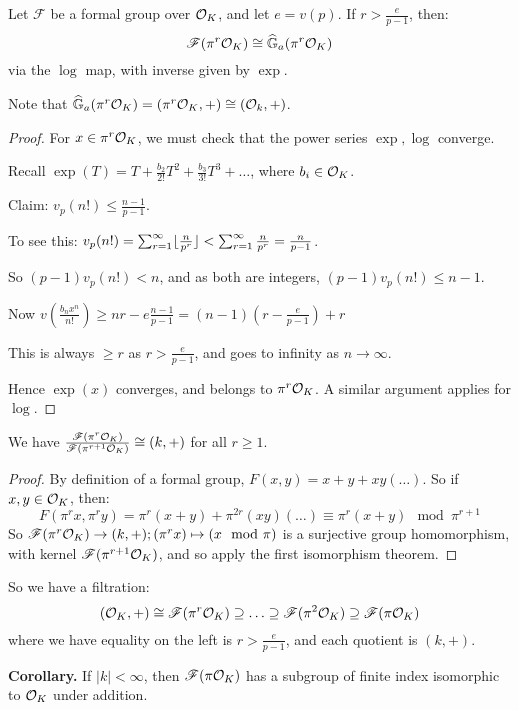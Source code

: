 \documentclass[10pt,a4paper]{article}
\begin{document}
\begin{theorem}
  Let $\mathscr{F}$ be a formal group over $\mathcal{O}_K$, and let $e = v(p)$. If $r > \frac{e}{p-1}$, then:
  \[\mathscr{F}(\pi^r\mathcal{O}_K) \cong \widehat{\mathbb{G}}_a(\pi^r\mathcal{O}_K)\]
  via the $\log$ map, with inverse given by $\exp$.
\end{theorem}
Note that $\widehat{\mathbb{G}}_a(\pi^r \mathcal{O}_K) = (\pi^r \mathcal{O}_K, +) \cong (\mathcal{O}_k, +)$.
\begin{proof}
  For $x \in \pi^r \mathcal{O}_K$, we must check that the power series $\exp, \log$ converge.

  Recall $\exp(T) = T+\frac{b_2}{2!}T^2 + \frac{b_3}{3!}T^3 + \ldots$, where $b_i \in \mathcal{O}_K$.

  Claim: $v_p(n!) \leq \frac{n-1}{p-1}$.

  To see this: $v_p(n!) = \sum_{r=1}^{\infty} \lfloor \frac{n}{p^r} \rfloor < \sum_{r=1}^\infty \frac{n}{p^r} = \frac{n}{p-1}$.

  So $(p-1)v_p(n!) < n$, and as both are integers, $(p-1)v_p(n!) \leq n-1$.

  Now $v(\frac{b_nx^n}{n!})\geq nr - e\frac{n-1}{p-1} = (n-1)\left(r-\frac{e}{p-1}\right) + r$

  This is always $\geq r$ as $r > \frac{e}{p-1}$, and goes to infinity as $n \to \infty$.

  Hence $\exp(x)$ converges, and belongs to $\pi^r \mathcal{O}_K$. A similar argument applies for $\log$.
\end{proof}
\begin{lemma}
  We have $\frac{\mathscr{F}(\pi^r\mathcal{O}_K)}{\mathscr{F}(\pi^{r+1}\mathcal{O}_K)} \cong (k, +)$ for all $r \geq 1$.
\end{lemma}
\begin{proof}
  By definition of a formal group, $F(x, y) = x + y + xy(\ldots)$. So if $x, y \in \mathcal{O}_K$, then:
  \[F(\pi^r x, \pi^r y) = \pi^r(x+y) + \pi^{2r}(xy)(\ldots) \equiv \pi^r(x+y) \mod \pi^{r+1}\]
  So $\mathscr{F}(\pi^r\mathcal{O}_K) \to (k, +); (\pi^r x) \mapsto (x \mod \pi)$ is a surjective group homomorphism, with kernel $\mathscr{F}(\pi^{r+1}\mathcal{O}_K)$, and so apply the first isomorphism theorem.
\end{proof}
So we have a filtration:
\[(\mathcal{O}_K, +) \cong \mathscr{F}(\pi^r\mathcal{O}_K) \supseteq \ldots \supseteq \mathscr{F}(\pi^2\mathcal{O}_K) \supseteq \mathscr{F}(\pi \mathcal{O}_K)\]
where we have equality on the left is $r >\frac{e}{p-1}$, and each quotient is $(k, +)$.

\textbf{Corollary.} If $|k| < \infty$, then $\mathscr{F}(\pi \mathcal{O}_K)$ has a subgroup of finite index isomorphic to $\mathcal{O}_K$ under addition.
\end{document}
